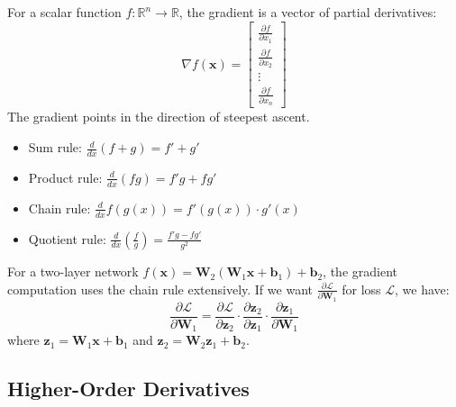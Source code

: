 \begin{definition}[Gradient]
For a scalar function $f: \mathbb{R}^n \to \mathbb{R}$, the gradient is a vector of partial derivatives:
\begin{equation}
\nabla f(\mathbf{x}) = \begin{bmatrix}
\frac{\partial f}{\partial x_1} \\
\frac{\partial f}{\partial x_2} \\
\vdots \\
\frac{\partial f}{\partial x_n}
\end{bmatrix}
\end{equation}
The gradient points in the direction of steepest ascent.
\end{definition}

\begin{property}
\begin{itemize}
    \item Sum rule: $\frac{d}{dx}(f + g) = f' + g'$
    \item Product rule: $\frac{d}{dx}(fg) = f'g + fg'$
    \item Chain rule: $\frac{d}{dx}f(g(x)) = f'(g(x)) \cdot g'(x)$
    \item Quotient rule: $\frac{d}{dx}\left(\frac{f}{g}\right) = \frac{f'g - fg'}{g^2}$
\end{itemize}
\end{property}

\begin{example}
For a two-layer network $f(\mathbf{x}) = \mathbf{W}_2(\mathbf{W}_1\mathbf{x} + \mathbf{b}_1) + \mathbf{b}_2$, the gradient computation uses the chain rule extensively. If we want $\frac{\partial \mathcal{L}}{\partial \mathbf{W}_1}$ for loss $\mathcal{L}$, we have:
\begin{equation}
\frac{\partial \mathcal{L}}{\partial \mathbf{W}_1} = \frac{\partial \mathcal{L}}{\partial \mathbf{z}_2} \cdot \frac{\partial \mathbf{z}_2}{\partial \mathbf{z}_1} \cdot \frac{\partial \mathbf{z}_1}{\partial \mathbf{W}_1}
\end{equation}
where $\mathbf{z}_1 = \mathbf{W}_1\mathbf{x} + \mathbf{b}_1$ and $\mathbf{z}_2 = \mathbf{W}_2\mathbf{z}_1 + \mathbf{b}_2$.
\end{example}

\subsection{Higher-Order Derivatives}

